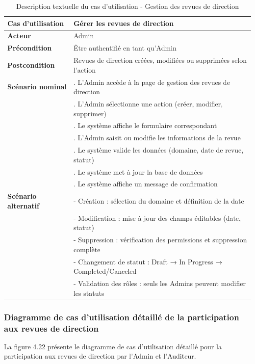 \vspace{\baselineskip}
\vspace{\baselineskip}
\vspace{\baselineskip}
\begin{longtable}{|>{\raggedright\arraybackslash}p{4cm}|>{\raggedright\arraybackslash}p{9cm}|}
\caption{Description textuelle du cas d'utilisation - Gestion des revues de direction}
\label{tab:manage_direction_reviews_usecase} \\
\hline
\textbf{Cas d'utilisation} & \textbf{Gérer les revues de direction} \\
\hline
\textbf{Acteur} & Admin \\
\hline
\textbf{Précondition} & Être authentifié en tant qu'Admin \\
\hline
\textbf{Postcondition} & Revues de direction créées, modifiées ou supprimées selon l'action \\
\hline
\textbf{Scénario nominal} & 
1. L'Admin accède à la page de gestion des revues de direction \\
& 2. L'Admin sélectionne une action (créer, modifier, supprimer) \\
& 3. Le système affiche le formulaire correspondant \\
& 4. L'Admin saisit ou modifie les informations de la revue \\
& 5. Le système valide les données (domaine, date de revue, statut) \\
& 6. Le système met à jour la base de données \\
& 7. Le système affiche un message de confirmation \\
\hline
\textbf{Scénario alternatif} & 
- Création : sélection du domaine et définition de la date \\
& - Modification : mise à jour des champs éditables (date, statut) \\
& - Suppression : vérification des permissions et suppression complète \\
& - Changement de statut : Draft → In Progress → Completed/Canceled \\
& - Validation des rôles : seuls les Admins peuvent modifier les statuts \\
\hline
\end{longtable}

\subsubsection{Diagramme de cas d'utilisation détaillé de la participation aux revues de direction}
\noindent La figure 4.22 présente le diagramme de cas d'utilisation détaillé pour la participation aux revues de direction par l'Admin et l'Auditeur.

